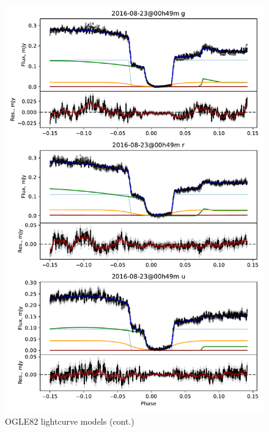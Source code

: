 \begin{figure}
    \centering
    \includegraphics[width=\textwidth]{figures/results/OGLE82/OGLE82_2.pdf}
    \caption{OGLE82 lightcurve models (cont.)}
    \label{fig:OGLE82 all lightcurves cont 1}
\end{figure}



